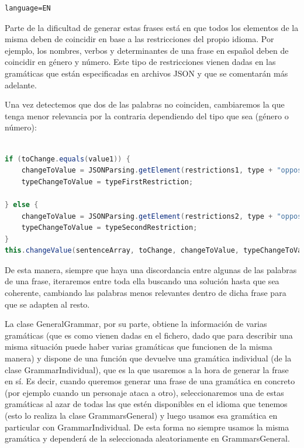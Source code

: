 \begin{verbatim}
language=EN
\end{verbatim}

Parte de la dificultad de generar estas frases está en que todos los elementos de la misma deben de coincidir en base a las restricciones del propio idioma. Por ejemplo, los nombres, verbos y determinantes de una frase en español deben de coincidir en género y número. Este tipo de restricciones vienen dadas en las gramáticas que están especificadas en archivos JSON y que se comentarán más adelante.

Una vez detectemos que dos de las palabras no coinciden, cambiaremos la que tenga menor relevancia por la contraria dependiendo del tipo que sea (género o número):

\begin{lstlisting}[language=java]

if (toChange.equals(value1)) {
    changeToValue = JSONParsing.getElement(restrictions1, type + "opposite");
    typeChangeToValue = typeFirstRestriction; 
     
} else {
    changeToValue = JSONParsing.getElement(restrictions2, type + "opposite");
    typeChangeToValue = typeSecondRestriction;
}
this.changeValue(sentenceArray, toChange, changeToValue, typeChangeToValue);

\end{lstlisting}

De esta manera, siempre que haya una discordancia entre algunas de las palabras de una frase, iteraremos entre toda ella buscando una solución hasta que sea coherente, cambiando las palabras menos relevantes dentro de dicha frase para que se adapten al resto.

La clase GeneralGrammar, por su parte, obtiene la información de varias gramáticas (que es como vienen dadas en el fichero, dado que para describir una misma situación puede haber varias gramáticas que funcionen de la misma manera) y dispone de una función que devuelve una gramática individual (de la clase GrammarIndividual), que es la que usaremos a la hora de generar la frase en sí. Es decir, cuando queremos generar una frase de una gramática en concreto (por ejemplo cuando un personaje ataca a otro), seleccionaremos una de estas gramáticas al azar de todas las que estén disponibles en el idioma que tenemos (esto lo realiza la clase GrammarsGeneral) y luego usamos esa gramática en particular con GrammarIndividual.  De esta forma no siempre usamos la misma gramática y dependerá de la seleccionada aleatoriamente en GrammarsGeneral.


